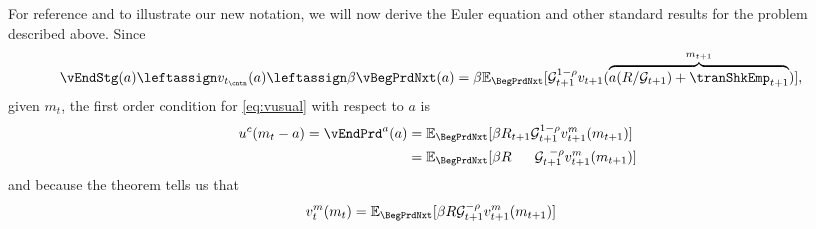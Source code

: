 \documentclass[titlepage, headings=optiontotocandhead]{econtex}
\begin{document}
For reference and to illustrate our new notation, we will now derive the Euler equation and other standard results for the problem described above.
Since
\begin{equation}\begin{gathered}\begin{aligned}
  \vEndStg(a) & \leftassign v_{t_\cntn}(a) \leftassign \beta \vBegPrdNxt(a) = \beta {\mathbb{E}}_{\BegPrdNxt}[\mathcal{G}_{t+1}^{1-\rho}v_{t+1}(\overbrace{a (R / \mathcal{G}_{t+1})+\tranShkEmp_{t+1}}^{m_{t+1}})],
\end{aligned}\end{gathered}\end{equation}
given $m_{t}$, the first order condition for \eqref{eq:vusual} with respect to $a$ is
\begin{equation}\begin{gathered}\begin{aligned}
      u^{c}(m_{t}-a) = \vEndPrd^{a}(a) & = {\mathbb{E}}_{\BegPrdNxt}[\beta R_{t+1}\mathcal{G}_{t+1}^{1-\rho}{v}^m_{t+1}(m_{t+1})]  \label{eq:upceqEvtp1}
      \\                        & =  {\mathbb{E}}_{\BegPrdNxt}[\beta R\phantom{._{t+1}}\mathcal{G}_{t+1}^{\phantom{1}-\rho}{v}^{m}_{t+1}(m_{t+1})]
    \end{aligned}\end{gathered}\end{equation}
and because the  theorem tells us that
\begin{equation}\begin{gathered}\begin{aligned}
      {v}^{m}_{t}(m_{t})  & =  {\mathbb{E}}_{\BegPrdNxt} [\beta R \mathcal{G}_{t+1}^{-\rho}{v}^{m}_{t+1}(m_{t+1})] \label{eq:envelope}
    \end{aligned}\end{gathered}\end{equation}
\end{document}
